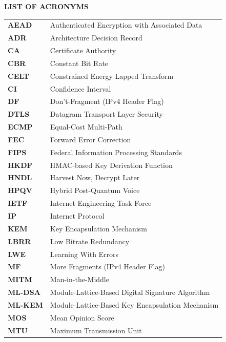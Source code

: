 \thispagestyle{plain}
\begin{center}
    {\fontsize{14}{18}\selectfont\textbf{LIST OF ACRONYMS}}\\[0.8cm]
\end{center}

\noindent
\begin{tabular}{p{3.0cm} p{11.5cm}}
    \textbf{AEAD} & Authenticated Encryption with Associated Data \\
    \textbf{ADR} & Architecture Decision Record \\
    \textbf{CA} & Certificate Authority \\
    \textbf{CBR} & Constant Bit Rate \\
    \textbf{CELT} & Constrained Energy Lapped Transform \\
    \textbf{CI} & Confidence Interval \\
    \textbf{DF} & Don't-Fragment (IPv4 Header Flag) \\
    \textbf{DTLS} & Datagram Transport Layer Security \\
    \textbf{ECMP} & Equal-Cost Multi-Path \\
    \textbf{FEC} & Forward Error Correction \\
    \textbf{FIPS} & Federal Information Processing Standards \\
    \textbf{HKDF} & HMAC-based Key Derivation Function \\
    \textbf{HNDL} & Harvest Now, Decrypt Later \\
    \textbf{HPQV} & Hybrid Post-Quantum Voice \\
    \textbf{IETF} & Internet Engineering Task Force \\
    \textbf{IP} & Internet Protocol \\
    \textbf{KEM} & Key Encapsulation Mechanism \\
    \textbf{LBRR} & Low Bitrate Redundancy \\
    \textbf{LWE} & Learning With Errors \\
    \textbf{MF} & More Fragments (IPv4 Header Flag) \\
    \textbf{MITM} & Man-in-the-Middle \\
    \textbf{ML-DSA} & Module-Lattice-Based Digital Signature Algorithm \\
    \textbf{ML-KEM} & Module-Lattice-Based Key Encapsulation Mechanism \\
    \textbf{MOS} & Mean Opinion Score \\
    \textbf{MTU} & Maximum Transmission Unit \\

\end{tabular}
